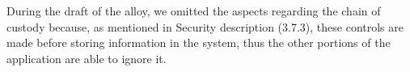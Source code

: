 During the draft of the alloy, we omitted the aspects regarding the chain of custody because, as mentioned in Security description (3.7.3), these controls are made before storing information in the system, thus the other portions of the application are able to ignore it.
